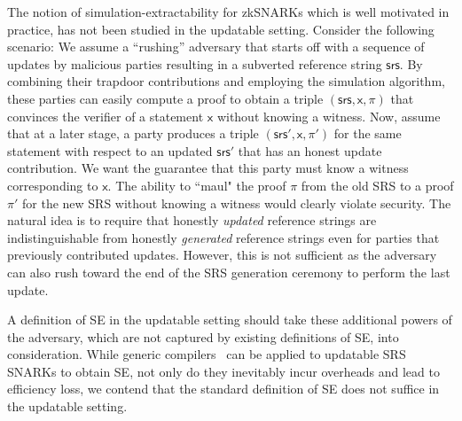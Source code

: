\documentclass[10pt]{llncs}
\newcommand{\pcvarstyle}[1]{\mathsf{#1}}
\newcommand{\srs}{\pcvarstyle{srs}}
\newcommand{\inp}{\pcvarstyle{x}}
\DeclareRobustCommand{\markulf}[2] {}%
\begin{document}
The notion of simulation-extractability for zkSNARKs which is well motivated in practice, has not been studied in the updatable setting.
Consider the following scenario: We assume a ``rushing'' adversary that starts off with a sequence of updates by malicious parties resulting in a subverted reference string $\srs$. By combining their trapdoor contributions and employing the simulation algorithm, these parties can easily compute a proof to obtain a triple $(\srs,\inp,\pi)$  that convinces the verifier of a statement $\inp$ without knowing a witness. Now, assume that at a later stage, a party produces a triple $(\srs',\inp,\pi')$ for the same statement with respect to an updated $\srs'$ that has an honest update contribution. We want the guarantee that this party must know a witness corresponding to $\inp$. The ability to ``maul" the proof $\pi$ from the old SRS to a proof $\pi'$ for the new SRS without knowing a witness would clearly violate security. The natural idea is to require that honestly \emph{updated} reference strings are indistinguishable from honestly \emph{generated} reference strings even for parties that previously contributed updates. However, this is not sufficient as the adversary can also rush toward the end of the SRS generation ceremony to perform the last update.


A definition of SE in the updatable setting should take these additional powers of the adversary, which are not captured by existing definitions of SE, into consideration.
While generic compilers~\cite{EPRINT:KZMQCP15,CCS:AbdRamSla20short} can be applied to updatable SRS SNARKs to obtain SE, not only do they inevitably incur overheads and lead to efficiency loss, we contend that the standard definition of SE does not suffice in the updatable setting.
\end{document}
